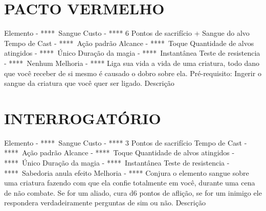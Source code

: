 \documentclass{article}%
\begin{document}
\section{PACTO VERMELHO}%
\label{sec:PACTOVERMELHO}%
Elemento {-} ****~Sangue\newline%
Custo {-} **** 6 Pontos de sacrifício + Sangue do alvo\newline%
Tempo de Cast {-} ****~Ação padrão\newline%
Alcance {-} ****~Toque\newline%
Quantidade de alvos atingidos {-} ****~Único\newline%
Duração da magia {-} ****~Instantânea\newline%
Teste de resistencia {-} ****~Nenhum\newline%
Melhoria {-} **** Liga sua vida a vida de uma criatura, todo dano que você receber de si mesmo é causado o dobro sobre ela. Pré{-}requisito: Ingerir o sangue da criatura que você quer ser ligado.\newline%
Descrição \newline%

%
\section{INTERROGATÓRIO}%
\label{sec:INTERROGATRIO}%
Elemento {-} ****~Sangue\newline%
Custo {-} **** 3 Pontos de sacrifício\newline%
Tempo de Cast {-} ****~Ação padrão\newline%
Alcance {-} ****~Toque\newline%
Quantidade de alvos atingidos {-} ****~Único\newline%
Duração da magia {-} ****~Instantânea\newline%
Teste de resistencia {-} ****~Sabedoria anula efeito\newline%
Melhoria {-} **** Conjura o elemento sangue sobre uma criatura fazendo com que ela confie totalmente em você, durante uma cena de não combate. Se for um aliado, cura d6 pontos de aflição, se for um inimigo ele respondera verdadeiramente perguntas de sim ou não.\newline%
Descrição \newline%

%
\end{document}

